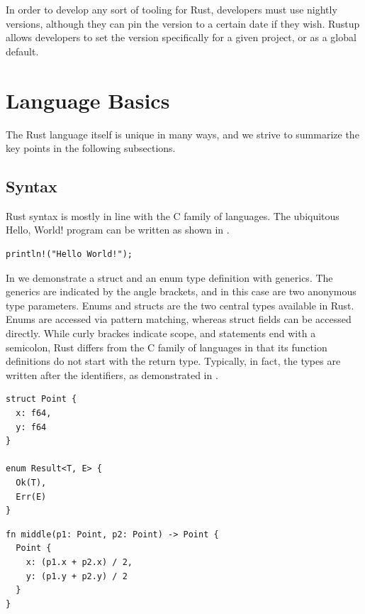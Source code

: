 \documentclass[paper=a4,%
  twoside,%
  BCOR4mm,%
  abstract=true,%
  toc=bibliography,%
  chapterprefix=true,%
  toc=bibliographynumbered,%
  open=right,%
  english,%
  pagesize=pdftex]{scrreprt}
\begin{document}
In order to develop any sort of tooling for Rust, developers must use nightly versions, although they can pin the version to a certain date if they wish.
Rustup allows developers to set the version specifically for a given project, or as a global default.

\section{Language Basics}
The Rust language itself is unique in many ways, and we strive to summarize the key points in the following subsections.

\subsection{Syntax}
Rust syntax is mostly in line with the C family of languages. The ubiquitous Hello, World! program can be written as shown in .
\begin{lstlisting}[style=boxed, caption=Hello World, label=lst:example-hello-world]
println!("Hello World!");
\end{lstlisting}

In  we demonstrate a struct and an enum type definition with generics. The generics are indicated by the angle brackets, and in this case are two anonymous type parameters. Enums and structs are the two central types available in Rust. Enums are accessed via pattern matching, whereas struct fields can be accessed directly. While curly brackes indicate scope, and statements end with a semicolon, Rust differs from the C family of languages in that its function definitions do not start with the return type. Typically, in fact, the types are written after the identifiers, as demonstrated in .

\begin{lstlisting}[style=boxed, caption={The type definition for a point in two-dimensional space and an enum definition}, label=lst:example-struct-enum]
struct Point {
  x: f64,
  y: f64
}

enum Result<T, E> {
  Ok(T),
  Err(E)
}
\end{lstlisting}


\begin{lstlisting}[style=boxed, caption={A function to compute the point between two points in two-dimensional space}, label=lst:example-functions-struct-enum]
fn middle(p1: Point, p2: Point) -> Point {
  Point {
    x: (p1.x + p2.x) / 2,
    y: (p1.y + p2.y) / 2
  }
}
\end{lstlisting}
\end{document}
